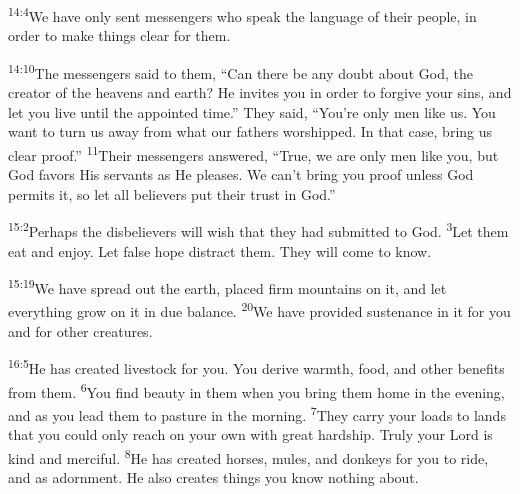 \documentclass[openany,12pt,english]{book}
\newenvironment{para}{\par\pretolerance=100\tolerance=200\setlength{\emergencystretch}{0.6em}\relax}{\par}
\begin{document}
\begin{para}
    \textsuperscript{14:4}\thinspace{}We have on\-ly sent messengers who speak the lan\-guage of their peo\-ple, in or\-der to make things clear for them.
\end{para}

\begin{para}
    \textsuperscript{14:10}\thinspace{}The messengers said to them, “Can there be any doubt a\-bout God, the cre\-a\-tor of the heavens and earth? He invites you in or\-der to for\-give your sins, and let you live un\-til the ap\-point\-ed time.” They said, “You're on\-ly men like us. You want to turn us a\-way from what our fathers wor\-shipped. In that case, bring us clear proof.”
    \textsuperscript{11}\thinspace{}Their messengers answered, “True, we are on\-ly men like you, but God fa\-vors His servants as He pleases. We can't bring you proof un\-less God permits it, so let all believers put their trust in God.”
\end{para}

\bigskip{}

\begin{para}
    \textsuperscript{15:2}\thinspace{}Per\-haps the disbelievers will wish that they had sub\-mit\-ted to God.
    \textsuperscript{3}\thinspace{}Let them eat and en\-joy. Let false hope dis\-tract them. They will come to know.
\end{para}

\begin{para}
    \textsuperscript{15:19}\thinspace{}We have spread out the earth, placed firm mountains on it, and let eve\-ry\-thing grow on it in due bal\-ance.
    \textsuperscript{20}\thinspace{}We have pro\-vid\-ed sus\-te\-nance in it for you and for oth\-er creatures.
\end{para}

\bigskip{}

\begin{para}
    \textsuperscript{16:5}\thinspace{}He has cre\-at\-ed live\-stock for you. You de\-rive warmth, food, and oth\-er benefits from them.
    \textsuperscript{6}\thinspace{}You find beau\-ty in them when you bring them home in the eve\-ning, and as you lead them to pas\-ture in the morn\-ing.
    \textsuperscript{7}\thinspace{}They car\-ry your loads to lands that you could on\-ly reach on your own with great hard\-ship. Tru\-ly your Lord is kind and mer\-ci\-ful.
    \textsuperscript{8}\thinspace{}He has cre\-at\-ed hors\-es, mules, and donkeys for you to ride, and as a\-dorn\-ment. He al\-so creates things you know noth\-ing a\-bout.
\end{para}
\end{document}
